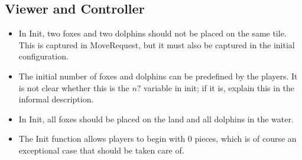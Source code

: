 \documentclass[a4paper,11pt]{article}
\begin{document}
    \subsection{Viewer and Controller}
    \begin{itemize}
        \item In Init, two foxes and two dolphins should not be placed on the same tile. This is captured in MoveRequest, but it must also be captured in the initial configuration.
        \item The initial number of foxes and dolphins can be predefined by the players. It is not clear whether this is the $n?$ variable in init; if it is, explain this in the informal description.
        \item In Init, all foxes should be placed on the land and all dolphins in the water.
        \item The Init function allows players to begin with $0$ pieces, which is of course an exceptional case that should be taken care of.
    \end{itemize}
\end{document}
